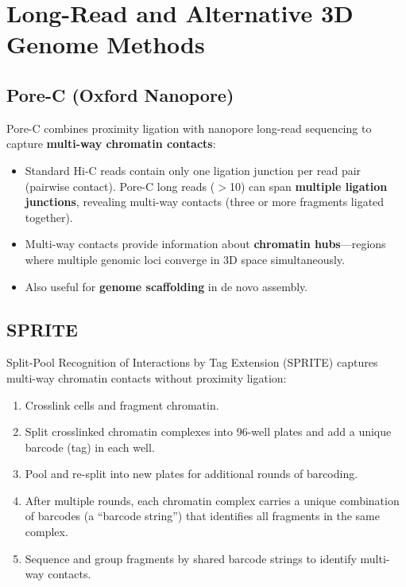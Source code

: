 \section{Long-Read and Alternative 3D Genome Methods}
\label{sec:3dgenome:alternative}

\subsection{Pore-C (Oxford Nanopore)}
\label{subsec:3dgenome:porec}

Pore-C combines proximity ligation with nanopore long-read sequencing to capture \textbf{multi-way chromatin contacts}:

\begin{itemize}[itemsep=2pt]
  \item Standard Hi-C reads contain only one ligation junction per read pair (pairwise contact). Pore-C long reads ($>$10\kilobase{}) can span \textbf{multiple ligation junctions}, revealing multi-way contacts (three or more fragments ligated together).
  \item Multi-way contacts provide information about \textbf{chromatin hubs}---regions where multiple genomic loci converge in 3D space simultaneously.
  \item Also useful for \textbf{genome scaffolding} in de novo assembly.
\end{itemize}

\subsection{SPRITE}
\label{subsec:3dgenome:sprite}

Split-Pool Recognition of Interactions by Tag Extension (SPRITE) captures multi-way chromatin contacts without proximity ligation:

\begin{enumerate}[itemsep=2pt]
  \item Crosslink cells and fragment chromatin.
  \item Split crosslinked chromatin complexes into 96-well plates and add a unique barcode (tag) in each well.
  \item Pool and re-split into new plates for additional rounds of barcoding.
  \item After multiple rounds, each chromatin complex carries a unique combination of barcodes (a ``barcode string'') that identifies all fragments in the same complex.
  \item Sequence and group fragments by shared barcode strings to identify multi-way contacts.
\end{enumerate}


